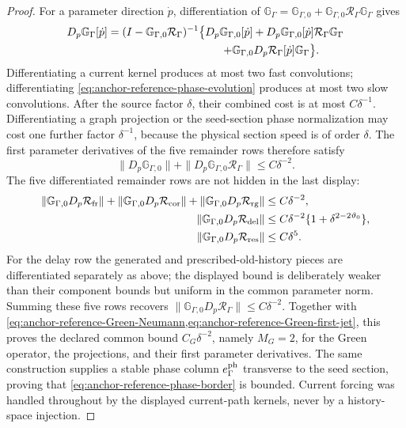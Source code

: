 \begin{proof}
For a parameter direction \(\dot p\), differentiation of
\(\mathbb G_\Gamma=\mathbb G_{\Gamma,0}
 +\mathbb G_{\Gamma,0}\mathcal R_\Gamma\mathbb G_\Gamma\) gives
\begin{multline}
 D_p\mathbb G_\Gamma[\dot p]
 =(I-\mathbb G_{\Gamma,0}\mathcal R_\Gamma)^{-1}
 \bigl\{D_p\mathbb G_{\Gamma,0}[\dot p]
 +D_p\mathbb G_{\Gamma,0}[\dot p]
       \mathcal R_\Gamma\mathbb G_\Gamma\\
 \hspace{42mm}
 +\mathbb G_{\Gamma,0}D_p\mathcal R_\Gamma[\dot p]
       \mathbb G_\Gamma\bigr\}.                    \label{eq:anchor-reference-Green-first-jet}
\end{multline}
Differentiating a current kernel produces at most two fast convolutions;
differentiating \cref{eq:anchor-reference-phase-evolution} produces at
most two slow convolutions.  After the source factor \(\delta\), their
combined cost is at most \(C\delta^{-1}\).  Differentiating a graph
projection or the seed-section phase normalization may cost one further
factor \(\delta^{-1}\), because the physical section speed is of order
\(\delta\).  The first parameter derivatives of the five remainder rows
therefore satisfy
\begin{equation}
 \|D_p\mathbb G_{\Gamma,0}\|
 +\|D_p\mathbb G_{\Gamma,0}\mathcal R_\Gamma\|
 \le C\delta^{-2}.                                   \label{eq:anchor-reference-principal-first-jet-bound}
\end{equation}
The five differentiated remainder rows are not hidden in the last display:
\begin{align}
 \|\mathbb G_{\Gamma,0}D_p\mathcal R_{\rm fr}\|
 +\|\mathbb G_{\Gamma,0}D_p\mathcal R_{\rm cor}\|
 +\|\mathbb G_{\Gamma,0}D_p\mathcal R_{\rm rg}\|
 &\le C\delta^{-2},\notag\\
 \|\mathbb G_{\Gamma,0}D_p\mathcal R_{\rm del}\|
 &\le C\delta^{-2}
      \{1+\delta^{2-2\vartheta_0}\},\notag\\
 \|\mathbb G_{\Gamma,0}D_p\mathcal R_{\rm res}\|
 &\le C\delta^5.                                      \label{eq:anchor-reference-five-remainder-jets}
\end{align}
For the delay row the generated and prescribed-old-history pieces are
differentiated separately as above; the displayed bound is deliberately
weaker than their component bounds but uniform in the common parameter
norm.  Summing these five rows recovers
\(\|\mathbb G_{\Gamma,0}D_p\mathcal R_\Gamma\|\le C\delta^{-2}\).
Together with
\cref{eq:anchor-reference-Green-Neumann,eq:anchor-reference-Green-first-jet},
this proves the declared common bound \(C_G\delta^{-2}\), namely
\(M_G=2\), for the Green operator, the projections, and their first
parameter derivatives.
The same construction supplies a stable phase column
\(e_\Gamma^{\rm ph}\) transverse to the seed section, proving that
\cref{eq:anchor-reference-phase-border} is bounded.  Current forcing was
handled throughout by the displayed current-path kernels, never by a
history-space injection.


\end{proof}
